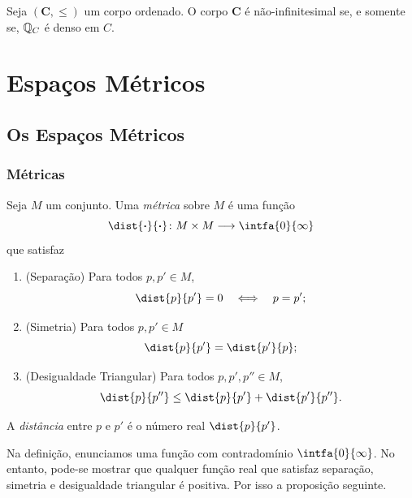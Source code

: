 \begin{prop}
Seja $(\bm C,\leq)$ um corpo ordenado. O corpo $\bm C$ é não-infinitesimal se, e somente se, $\mathbb{Q}_C$ é denso em $C$.
\end{prop}














\chapter{Espaços Métricos}

\section{Os Espaços Métricos}

\subsection{Métricas}

\begin{defi}
Seja $M$ um conjunto. Uma \emph{métrica} sobre $M$ é uma função
	\begin{equation*}
	\dist{\var}{\var}\colon M \times M \to \intfa{0}{\infty}
	\end{equation*}
que satisfaz
	\begin{enumerate}
	\item (Separação) Para todos $p,p' \in M$,
		\begin{equation*}
		\dist{p}{p'} = 0 \sse p = p';
		\end{equation*}
	\item (Simetria) Para todos $p,p' \in M$
		\begin{equation*}
		\dist{p}{p'} = \dist{p'}{p};
		\end{equation*}
	\item (Desigualdade Triangular) Para todos $p,p',p'' \in M$,
		\begin{equation*}
		\dist{p}{p''} \leq \dist{p}{p'} + \dist{p'}{p''}.
		\end{equation*}
	\end{enumerate}
A \emph{distância} entre $p$ e $p'$ é o número real $\dist{p}{p'}$.
\end{defi}

Na definição, enunciamos uma função com contradomínio $\intfa{0}{\infty}$. No entanto, pode-se mostrar que qualquer função real que satisfaz separação, simetria e desigualdade triangular é positiva. Por isso a proposição seguinte.

